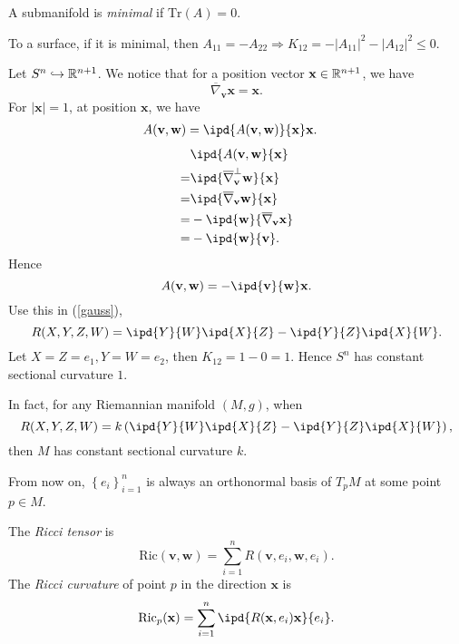 \begin{definition}
  A submanifold is \textit{minimal} if $\mathrm{Tr}(A)=0$.
\end{definition}
To a surface, if it is minimal, then $A_{11}=-A_{22}\Rightarrow K_{12}=-|A_{11}|^2-|A_{12}|^2\le 0$.
\begin{example}
  Let $S^n\hookrightarrow \mathbb{R}^{n+1}$. We notice that for a position vector  $\mathbf{x}\in \mathbb{R}^{n+1}$, we have
  \begin{equation}
    \overline{\nabla }_{\mathbf{v}}\mathbf{x}=\mathbf{x}.
  \end{equation}
  For $|\mathbf{x}|=1$, at position $\mathbf{x}$, we have
  \begin{align*}
    A(\mathbf{v},\mathbf{w})&= \ipd{A(\mathbf{v},\mathbf{w})}{\mathbf{x}}\mathbf{x}
  .\end{align*}
  \begin{align*}
    &\ipd{A(\mathbf{v},\mathbf{w}}{\mathbf{x}}\\
    =& \ipd{\overline{\nabla }_{\mathbf{v}}^{\perp}\mathbf{w}}{\mathbf{x}}\\
    =& \ipd{\overline{\nabla }_{\mathbf{v}}\mathbf{w}}{\mathbf{x}}\\
    =&-\ipd{\mathbf{w}}{\overline{\nabla }_{\mathbf{v}}\mathbf{x}}\\
    =&-\ipd{\mathbf{w}}{\mathbf{v}}
  .\end{align*}
  Hence 
  \[
    A(\mathbf{v},\mathbf{w})=-\ipd{\mathbf{v}}{\mathbf{w}}\mathbf{x}.
  \] 
  Use this in (\ref{gauss}), 
  \[
    R(X,Y,Z,W)=\ipd{Y}{W}\ipd{X}{Z}-\ipd{Y}{Z}\ipd{X}{W}.
  \] 
  Let $X=Z=e_1,Y=W=e_2$, then  $K_{12}=1-0=1$. Hence $S^n$ has constant sectional curvature $1$.

  In fact, for any Riemannian manifold $(M,g)$, when $$R(X,Y,Z,W)=k \left( \ipd{Y}{W}\ipd{X}{Z}-\ipd{Y}{Z}\ipd{X}{W} \right), $$ then $M$ has constant sectional curvature $k$.
\end{example}

From now on, $\left\{e_i\right\} _{i=1}^n$ is always an orthonormal basis of $T_p M$ at some point  $p\in M$.
\begin{definition}
  The \textit{Ricci tensor} is
  \begin{equation}
    \mathrm{Ric}(\mathbf{v},\mathbf{w})=\sum_{i=1}^{n} R(\mathbf{v},e_i,\mathbf{w},e_i).
  \end{equation}
  The \textit{Ricci curvature} of point $p$ in the direction $\mathbf{x}$ is
  \begin{equation}
    \mathrm{Ric}_p(\mathbf{x})= \sum_{i=1}^{n} \ipd{R(\mathbf{x},e_i)\mathbf{x}}{e_i}.
  \end{equation}
\end{definition}
 

